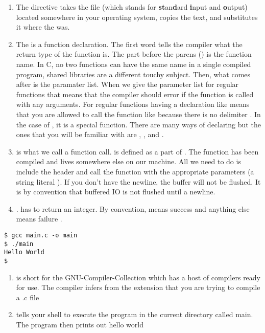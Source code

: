 \begin{enumerate}
	\item The  directive takes the file  (which stands for \textbf{st}an\textbf{d}ard \textbf{i}nput and \textbf{o}utput) located somewhere in your operating system, copies the text, and substitutes it where the  was.
	\item The  is a function declaration. The first word  tells the compiler what the return type of the function is. The part before the parens () is the function name. In C, no two functions can have the same name in a single compiled program, shared libraries are a different touchy subject. Then, what comes after is the paramater list. When we give the parameter list for regular functions  that means that the compiler should error if the function is called with any arguments. For regular functions having a declaration like  means that you are allowed to call the function like  because there is no delimiter \cite{CITATION_NEEDED}. In the case of , it is a special function. There are many ways of declaring  but the ones that you will be familiar with are , , and .
	\item {} is what we call a function call.  is defined as a part of . The function has been compiled and lives somewhere else on our machine. All we need to do is include the header and call the function with the appropriate parameters (a string literal ). If you don't have the newline, the buffer will not be flushed. It is by convention that buffered IO is not flushed until a newline. \cite{CITATION_NEEDED}
	\item {}.  has to return an integer. By convention,  means success and anything else means failure \cite{CITATION_NEEDED}.
\end{enumerate}

\begin{lstlisting}
$ gcc main.c -o main
$ ./main
Hello World
$
\end{lstlisting}

\begin{enumerate}
	\item {} is short for the GNU-Compiler-Collection which has a host of compilers ready for use. The compiler infers from the extension that you are trying to compile a .c file
	\item {} tells your shell to execute the program in the current directory called main. The program then prints out hello world
\end{enumerate}

